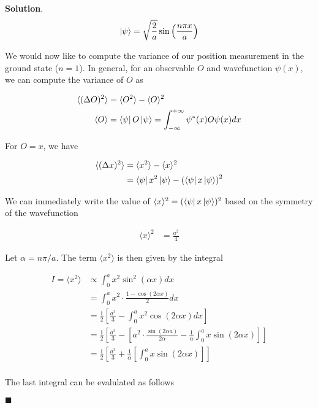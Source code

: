 \documentclass[12pt]{article}
\theoremstyle{definition}
\newenvironment{s}{%
        \begin{trivlist} \item \textbf{Solution}. }{%
            \hspace*{\fill} $\blacksquare$\end{trivlist}}%
\begin{document}
{\begin{s}
\begin{align*}
\ket{\psi} = \sqrt{\frac{2}{a}}\sin\left(\frac{n\pi x}{a}\right)
\end{align*}

We would now like to compute the variance of our position measurement in the ground state ($n=1$). In general, for an observable $O$ and wavefunction $\psi(x)$, we can compute the variance of $O$ as 

\begin{align*}
\langle (\Delta O)^{2}\rangle &= \langle O^{2} \rangle - \langle O\rangle^{2}\\
\langle O \rangle &=  \bra{\psi} O \ket{\psi} = \int_{-\infty}^{+\infty} \psi^{*}(x) O \psi(x)dx
\end{align*}

For $O=x$, we have

\begin{align*}
\langle (\Delta x)^{2}\rangle &= \langle x^{2} \rangle - \langle x\rangle^{2}\\
&= \bra{\psi} x^{2} \ket{\psi} - \left(\bra{\psi} x \ket{\psi}\right)^{2}\\
\end{align*}

We can immediately write the value of $\langle x \rangle^{2}= (\bra{\psi} x \ket{\psi})^{2}$ based on the symmetry of the wavefunction

\begin{align*}
\langle x \rangle^{2} &= \frac{a^{2}}{4}
\end{align*}

Let $\alpha = n\pi/a$. The term $\langle x^{2} \rangle$ is then given by the integral

\begin{align*}
I = \langle x^{2} \rangle &\propto \int_{0}^{a} x^{2} \sin^{2}\left(\alpha x\right)dx\\
&= \int_{0}^{a} x^{2}\cdot \frac{1-\cos(2\alpha x)}{2}dx\\
&= \frac{1}{2}\left[\frac{a^{3}}{3}- \int_{0}^{a}x^{2}\cos(2\alpha x)dx\right]\\
&= \frac{1}{2}\left[\frac{a^{3}}{3}- \left[a^{2}\cdot \frac{\sin(2\alpha a)}{2\alpha} - \frac{1}{\alpha}\int_{0}^{a} x\sin(2\alpha x)\right]\right]\\
&= \frac{1}{2}\left[\frac{a^{3}}{3}+ \frac{1}{\alpha}\left[\int_{0}^{a} x\sin(2\alpha x)\right]\right]\\
\end{align*}

The last integral can be evalulated as follows


\end{s}}
\end{document}
